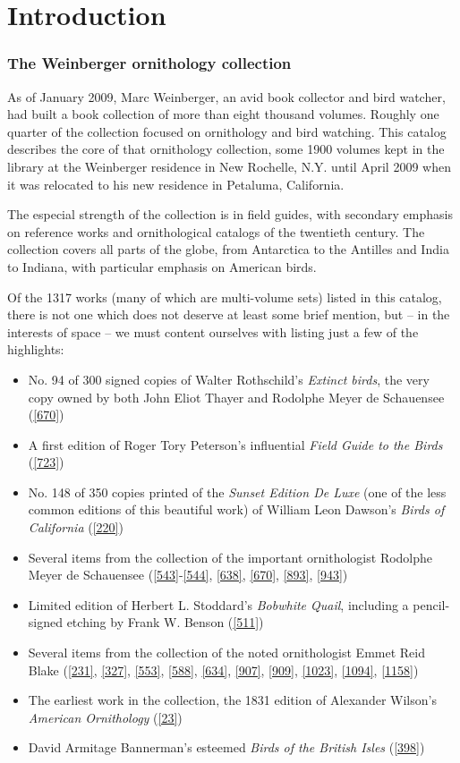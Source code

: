 \chapter*{Introduction}

\subsection*{The Weinberger ornithology collection}
\pagestyle{plain}

As of January 2009, Marc Weinberger, an avid book collector and bird watcher, had
built a book collection of more than eight thousand volumes. Roughly one quarter
of the collection focused on ornithology and bird watching. This catalog describes
the core of that ornithology collection, some 1900 volumes kept in the library at
the Weinberger residence in New Rochelle, N.Y. until April 2009 when it was
relocated to his new residence in Petaluma, California.

The especial strength of the collection is in field guides, with secondary emphasis
on reference works and ornithological catalogs of the twentieth century.
The collection covers all parts of the globe, from Antarctica to the Antilles and
India to Indiana, with particular emphasis on American birds.

Of the 1317 works (many of which are multi-volume sets) listed in this catalog,
there is not one which does not deserve at least some brief mention, but -- in
the interests of space -- we must content ourselves with listing just a few of
the highlights:
\begin{itemize}
\item No. 94 of 300 signed copies of Walter Rothschild's \textit{Extinct birds},
	the very copy owned by both John Eliot Thayer and Rodolphe Meyer de Schauensee (\ref{670})
\item A first edition of Roger Tory Peterson's influential \textit{Field Guide to
	the Birds} (\ref{723})
\item No. 148 of 350 copies printed of the \textit{Sunset Edition De Luxe} (one
	of the less common editions of this beautiful work) of William Leon Dawson's
	\textit{Birds of California} (\ref{220})
\item Several items from the collection of the important ornithologist Rodolphe
	Meyer de Schauensee (\ref{543}-\ref{544}, \ref{638}, \ref{670}, \ref{893}, \ref{943})
\item Limited edition of Herbert L. Stoddard's \textit{Bobwhite Quail}, including
	a pencil-signed etching by Frank W. Benson (\ref{511})
\item Several items from the collection of the noted ornithologist Emmet Reid
	Blake (\ref{231}, \ref{327}, \ref{553}, \ref{588}, \ref{634}, \ref{907},
	\ref{909}, \ref{1023}, \ref{1094}, \ref{1158})
\item The earliest work in the collection, the 1831 edition of Alexander Wilson's
	\textit{American Ornithology} (\ref{23})
\item David Armitage Bannerman's esteemed \textit{Birds of the British Isles} (\ref{398})
\end{itemize}

